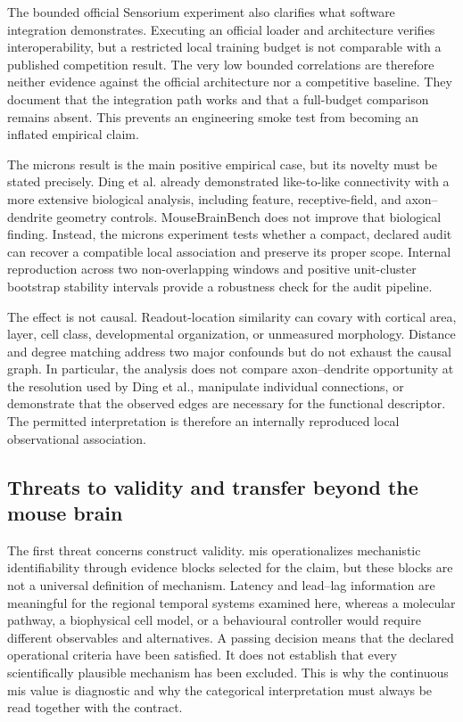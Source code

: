 The bounded official Sensorium experiment also clarifies what software
integration demonstrates. Executing an official loader and architecture verifies
interoperability, but a restricted local training budget is not comparable with
a published competition result. The very low bounded correlations are therefore
neither evidence against the official architecture nor a competitive baseline.
They document that the integration path works and that a full-budget comparison
remains absent. This prevents an engineering smoke test from becoming an
inflated empirical claim.

The \acs{microns} result is the main positive empirical case, but its novelty must be
stated precisely. Ding et al. already demonstrated like-to-like connectivity
with a more extensive biological analysis, including feature, receptive-field,
and axon--dendrite geometry controls. MouseBrainBench does not improve that
biological finding. Instead, the \acs{microns} experiment tests whether a compact,
declared audit can recover a compatible local association and preserve its
proper scope. Internal reproduction across two non-overlapping windows and positive
unit-cluster bootstrap stability intervals provide a robustness check for the audit
pipeline.

The effect is not causal. Readout-location similarity can covary with cortical
area, layer, cell class, developmental organization, or unmeasured morphology.
Distance and degree matching address two major confounds but do not exhaust the
causal graph. In particular, the analysis does not compare axon--dendrite
opportunity at the resolution used by Ding et al., manipulate individual
connections, or demonstrate that the observed edges are necessary for the
functional descriptor. The permitted interpretation is therefore an internally reproduced
local observational association.

\subsection{Threats to validity and transfer beyond the mouse brain}
\label{subsec:validity-transfer}

The first threat concerns construct validity. \acs{mis} operationalizes mechanistic
identifiability through evidence blocks selected for the claim, but these blocks
are not a universal definition of mechanism. Latency and lead--lag information
are meaningful for the regional temporal systems examined here, whereas a
molecular pathway, a biophysical cell model, or a behavioural controller would
require different observables and alternatives. A passing decision means that
the declared operational criteria have been satisfied. It does not establish
that every scientifically plausible mechanism has been excluded. This is why
the continuous \acs{mis} value is diagnostic and why the categorical interpretation
must always be read together with the contract.

